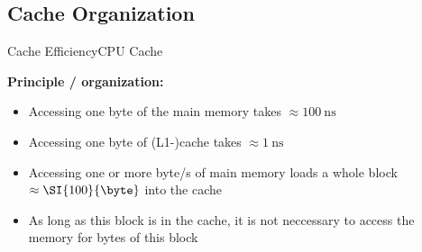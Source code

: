 
\subsection{Cache Organization}

\begin{frame}{Cache Efficiency}{CPU Cache}
  \vspace{-1.5em}
  \begin{figure}
    \begin{adjustbox}{width=\linewidth}
      
    \end{adjustbox}
    \label{fig:caching:cache_hirarchy}
  \end{figure}
  \textbf{Principle / organization:}
  \begin{itemize}
    \item<3->
      Accessing one byte of the main memory takes
      $\approx\SI{100}{\nano\second}$
    \item<4->
      Accessing one byte of (L1-)cache takes
      $\approx\SI{1}{\nano\second}$
    \item<5->
      Accessing one or more byte/s of main memory loads a whole
      block $\approx\SI{100}{\byte}$ into the cache
    \item<6->
      As long as this block is in the cache, it is not neccessary to
      access the memory for bytes of this block
  \end{itemize}
\end{frame}


